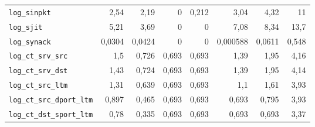\begin{table}[htbp]
\begin{tablacompacta}
\begin{tabular}{@{}lrrrrrrr@{}}
  \texttt{log\_sinpkt} & 2,54 & 2,19 & 0 & 0,212 & 3,04 & 4,32 & 11 \\
  \texttt{log\_sjit} & 5,21 & 3,69 & 0 & 0 & 7,08 & 8,34 & 13,7 \\
  \texttt{log\_synack} & 0,0304 & 0,0424 & 0 & 0 & 0,000588 & 0,0611 & 0,548 \\
  \texttt{log\_ct\_srv\_src} & 1,5 & 0,726 & 0,693 & 0,693 & 1,39 & 1,95 & 4,16 \\
  \texttt{log\_ct\_srv\_dst} & 1,43 & 0,724 & 0,693 & 0,693 & 1,39 & 1,95 & 4,14 \\
  \texttt{log\_ct\_src\_ltm} & 1,31 & 0,639 & 0,693 & 0,693 & 1,1 & 1,61 & 3,93 \\
  \texttt{log\_ct\_src\_dport\_ltm} & 0,897 & 0,465 & 0,693 & 0,693 & 0,693 & 0,795 & 3,93 \\
  \texttt{log\_ct\_dst\_sport\_ltm} & 0,78 & 0,335 & 0,693 & 0,693 & 0,693 & 0,693 & 3,37 \\
  \bottomrule
  \end{tabular}
  \end{tablacompacta}
\end{table}

\FloatBarrier

